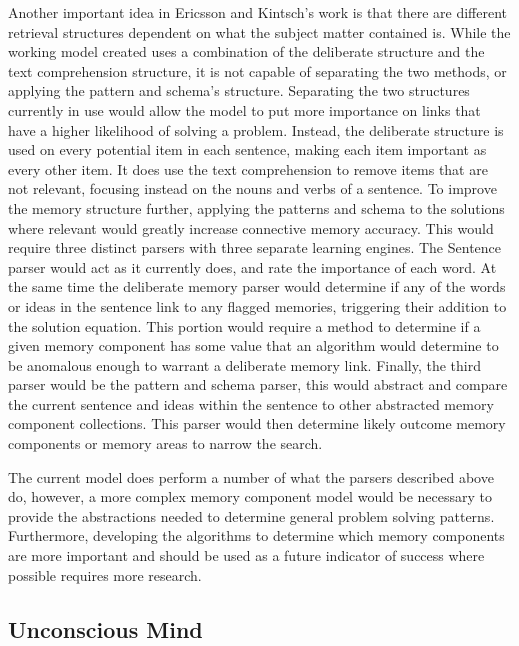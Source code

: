 Another important idea in Ericsson and Kintsch's work is that there are
different retrieval structures dependent on what the subject matter contained
is.  While the working model created uses a combination of the deliberate
structure and the text comprehension structure, it is not capable of separating
the two methods, or applying the pattern and schema's structure.  Separating the
two structures currently in use would allow the model to put more importance on
links that have a higher likelihood of solving a problem.  Instead, the
deliberate structure is used on every potential item in each sentence, making
each item important as every other item.  It does use the text comprehension to
remove items that are not relevant, focusing instead on the nouns and verbs of a
sentence.  To improve the memory structure further, applying the patterns and
schema to the solutions where relevant would greatly increase connective memory
accuracy.  This would require three distinct parsers with three separate
learning engines.  The Sentence parser would act as it currently does, and rate
the importance of each word.  At the same time the deliberate memory parser
would determine if any of the words or ideas in the sentence link to any flagged
memories, triggering their addition to the solution equation.  This portion
would require a method to determine if a given memory component has some value
that an algorithm would determine to be anomalous enough to warrant a deliberate
memory link. Finally, the third parser would be the pattern and schema parser,
this would abstract and compare the current sentence and ideas within the
sentence to other abstracted memory component collections.  This parser would
then determine likely outcome memory components or memory areas to narrow the
search.

The current model does perform a number of what the parsers described above do,
however, a more complex memory component model would be necessary to provide the
abstractions needed to determine general problem solving patterns.  Furthermore,
developing the algorithms to determine which memory components are more
important and should be used as a future indicator of success where possible
requires more research.

\subsection{Unconscious Mind}

